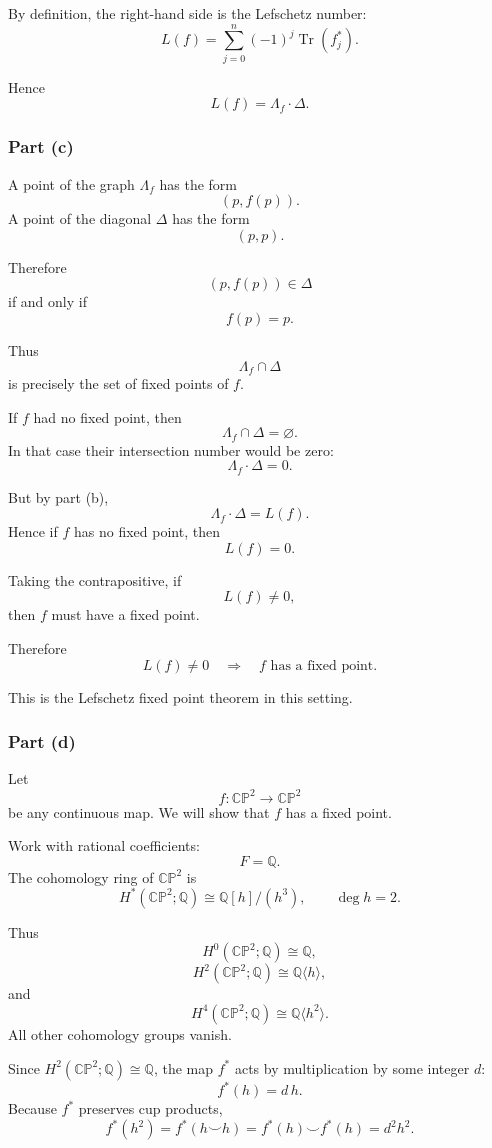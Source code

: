 \documentclass[12pt,a4paper]{article}
\theoremstyle{notespace}
\begin{document}
By definition, the right-hand side is the Lefschetz number:
\[
L(f)
=
\sum_{j=0}^{n}
(-1)^j
\operatorname{Tr}(f_j^*).
\]

Hence
\[
\boxed{
	L(f)=\Lambda_f\cdot \Delta.
}
\]

\subsubsection*{Part (c)}

A point of the graph \(\Lambda_f\) has the form
\[
(p,f(p)).
\]
A point of the diagonal \(\Delta\) has the form
\[
(p,p).
\]

Therefore
\[
(p,f(p))\in \Delta
\]
if and only if
\[
f(p)=p.
\]

Thus
\[
\Lambda_f\cap \Delta
\]
is precisely the set of fixed points of \(f\).

If \(f\) had no fixed point, then
\[
\Lambda_f\cap \Delta=\varnothing.
\]
In that case their intersection number would be zero:
\[
\Lambda_f\cdot \Delta=0.
\]

But by part (b),
\[
\Lambda_f\cdot \Delta=L(f).
\]
Hence if \(f\) has no fixed point, then
\[
L(f)=0.
\]

Taking the contrapositive, if
\[
L(f)\neq 0,
\]
then \(f\) must have a fixed point.

Therefore
\[
\boxed{
	L(f)\neq 0
	\quad\Longrightarrow\quad
	f\text{ has a fixed point.}
}
\]

This is the Lefschetz fixed point theorem in this setting.

\subsubsection*{Part (d)}

Let
\[
f:\mathbb{CP}^2\to \mathbb{CP}^2
\]
be any continuous map. We will show that \(f\) has a fixed point.

Work with rational coefficients:
\[
F=\mathbb Q.
\]
The cohomology ring of \(\mathbb{CP}^2\) is
\[
H^*(\mathbb{CP}^2;\mathbb Q)
\cong
\mathbb Q[h]/(h^3),
\qquad
\deg h=2.
\]

Thus
\[
H^0(\mathbb{CP}^2;\mathbb Q)\cong \mathbb Q,
\]
\[
H^2(\mathbb{CP}^2;\mathbb Q)\cong \mathbb Q\langle h\rangle,
\]
and
\[
H^4(\mathbb{CP}^2;\mathbb Q)\cong \mathbb Q\langle h^2\rangle.
\]
All other cohomology groups vanish.

Since \(H^2(\mathbb{CP}^2;\mathbb Q)\cong \mathbb Q\), the map \(f^*\) acts by
multiplication by some integer \(d\):
\[
f^*(h)=d\,h.
\]
Because \(f^*\) preserves cup products,
\[
f^*(h^2)=f^*(h\smile h)=f^*(h)\smile f^*(h)=d^2h^2.
\]
\end{document}
